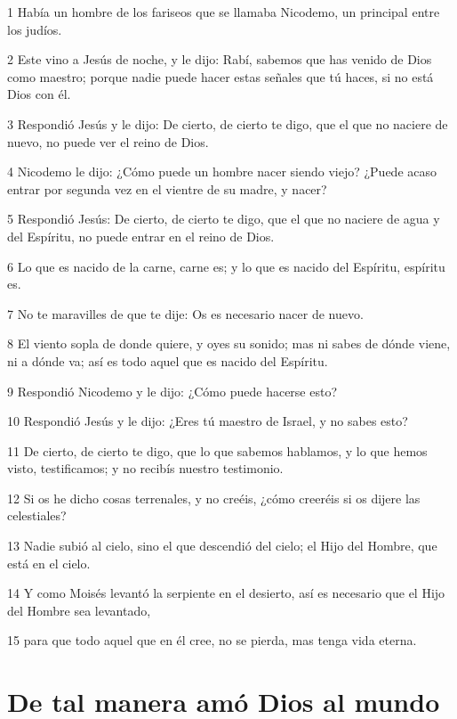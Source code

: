 \par 1 Había un hombre de los fariseos que se llamaba Nicodemo, un principal entre los judíos.
\par 2 Este vino a Jesús de noche, y le dijo: Rabí, sabemos que has venido de Dios como maestro; porque nadie puede hacer estas señales que tú haces, si no está Dios con él.
\par 3 Respondió Jesús y le dijo: De cierto, de cierto te digo, que el que no naciere de nuevo, no puede ver el reino de Dios.
\par 4 Nicodemo le dijo: ¿Cómo puede un hombre nacer siendo viejo? ¿Puede acaso entrar por segunda vez en el vientre de su madre, y nacer?
\par 5 Respondió Jesús: De cierto, de cierto te digo, que el que no naciere de agua y del Espíritu, no puede entrar en el reino de Dios.
\par 6 Lo que es nacido de la carne, carne es; y lo que es nacido del Espíritu, espíritu es.
\par 7 No te maravilles de que te dije: Os es necesario nacer de nuevo.
\par 8 El viento sopla de donde quiere, y oyes su sonido; mas ni sabes de dónde viene, ni a dónde va; así es todo aquel que es nacido del Espíritu.
\par 9 Respondió Nicodemo y le dijo: ¿Cómo puede hacerse esto?
\par 10 Respondió Jesús y le dijo: ¿Eres tú maestro de Israel, y no sabes esto?
\par 11 De cierto, de cierto te digo, que lo que sabemos hablamos, y lo que hemos visto, testificamos; y no recibís nuestro testimonio.
\par 12 Si os he dicho cosas terrenales, y no creéis, ¿cómo creeréis si os dijere las celestiales?
\par 13 Nadie subió al cielo, sino el que descendió del cielo; el Hijo del Hombre, que está en el cielo.
\par 14 Y como Moisés levantó la serpiente en el desierto, así es necesario que el Hijo del Hombre sea levantado,
\par 15 para que todo aquel que en él cree, no se pierda, mas tenga vida eterna.

\section*{De tal manera amó Dios al mundo}

